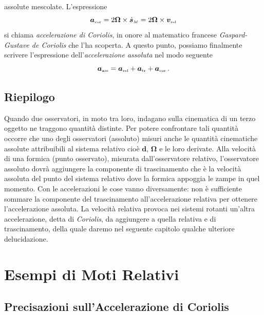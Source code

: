assolute  mescolate. L'espressione
\begin{equation}
{\bm a}_{\scriptscriptstyle{{\rm cor}}}=
2 {\bm \Omega}\times 
\dot{\bm{s}}_{\scriptscriptstyle{M}}=
2 {\bm \Omega}\times 
{\bm v}_{\scriptscriptstyle{{\rm rel}}}
\label{e137}
\end{equation}
\noindent si chiama {\em accelerazione di Coriolis}, in onore al matematico francese
{\em Gaspard-Gustave de Coriolis} che l'ha scoperta.
A questo punto, possiamo finalmente scrivere l'espressione
dell'{\em accelerazione assoluta}
nel modo seguente
\begin{equation}
{\bm a}_{\scriptscriptstyle{{\rm ass}}}=
{\bm a}_{\scriptscriptstyle{{\rm rel}}}+
{\bm a}_{\scriptscriptstyle{{\rm tr}}}+
{\bm a}_{\scriptscriptstyle{{\rm cor}}}\,.
\label{e138}
\end{equation}

\section{Riepilogo}

\noindent  Quando due osservatori,
in moto tra loro, indagano sulla cinematica di un terzo oggetto ne traggono
quantit\`a distinte. Per potere confrontare tali quantit\`a occorre che uno degli
osservatori (assoluto) misuri anche le quantit\`a cinematiche assolute
attribuibili al sistema relativo cio\`e
$\bm d$, $\bm \Omega$ e le loro derivate.
Alla velocit\`a di una formica (punto osservato), misurata dall'osservatore
relativo, l'osservatore assoluto dovr\`a aggiungere la componente di trascinamento
che \`e la velocit\`a assoluta del punto del sistema relativo dove la formica appoggia le 
zampe in quel momento.
Con le accelerazioni le cose vanno diversamente: non \`e sufficiente sommare la componente
del trascinamento all'accelerazione relativa per ottenere l'accelerazione assoluta. La
velocit\`a relativa provoca nei sistemi rotanti un'altra accelerazione,
detta di {\em Coriolis}, da aggiungere a quella relativa e di trascinamento, della quale
daremo nel seguente capitolo qualche ulteriore delucidazione.
\newpage
\thispagestyle{empty}
\null

\chapter{Esempi di Moti Relativi}

\section{Precisazioni sull'Accelerazione di Coriolis} 

